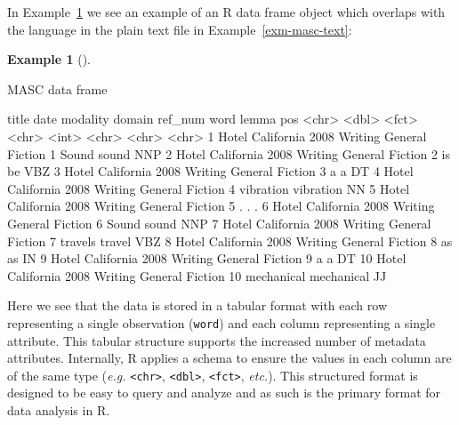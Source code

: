 \documentclass[
  letterpaper,
  DIV=11,
  numbers=noendperiod]{scrreprt}
\newenvironment{Shaded}{\begin{snugshade}}{\end{snugshade}}
\newcommand{\KeywordTok}[1]{\textcolor[rgb]{0.00,0.00,0.00}{#1}}
\newcommand{\NormalTok}[1]{\textcolor[rgb]{0.00,0.00,0.00}{#1}}
\theoremstyle{definition}
\newtheorem{example}{Example}[chapter]
\theoremstyle{remark}
\begin{document}
In Example~\ref{exm-masc-df} we see an example of an R data frame object
which overlaps with the language in the plain text file in
Example~\ref{exm-masc-text}:

\begin{example}[]\protect\hypertarget{exm-masc-df}{}\label{exm-masc-df}

MASC data frame

\begin{Shaded}
\begin{Highlighting}[]
\NormalTok{   title             date modality domain          ref\_num word       lemma      pos}
\NormalTok{   \textless{}}\KeywordTok{chr}\NormalTok{\textgreater{}            \textless{}}\KeywordTok{dbl}\NormalTok{\textgreater{} \textless{}}\KeywordTok{fct}\NormalTok{\textgreater{}    \textless{}}\KeywordTok{chr}\NormalTok{\textgreater{}             \textless{}}\KeywordTok{int}\NormalTok{\textgreater{} \textless{}}\KeywordTok{chr}\NormalTok{\textgreater{}      \textless{}}\KeywordTok{chr}\NormalTok{\textgreater{}      \textless{}}\KeywordTok{chr}\NormalTok{\textgreater{}}
\NormalTok{ 1 Hotel California  2008 Writing  General Fiction       1 Sound      sound      NNP}
\NormalTok{ 2 Hotel California  2008 Writing  General Fiction       2 is         be         VBZ}
\NormalTok{ 3 Hotel California  2008 Writing  General Fiction       3 a          a          DT}
\NormalTok{ 4 Hotel California  2008 Writing  General Fiction       4 vibration  vibration  NN}
\NormalTok{ 5 Hotel California  2008 Writing  General Fiction       5 .          .          .}
\NormalTok{ 6 Hotel California  2008 Writing  General Fiction       6 Sound      sound      NNP}
\NormalTok{ 7 Hotel California  2008 Writing  General Fiction       7 travels    travel     VBZ}
\NormalTok{ 8 Hotel California  2008 Writing  General Fiction       8 as         as         IN}
\NormalTok{ 9 Hotel California  2008 Writing  General Fiction       9 a          a          DT}
\NormalTok{10 Hotel California  2008 Writing  General Fiction      10 mechanical mechanical JJ}
\end{Highlighting}
\end{Shaded}

\end{example}

Here we see that the data is stored in a tabular format with each row
representing a single observation (\texttt{word}) and each column
representing a single attribute. This tabular structure supports the
increased number of metadata attributes. Internally, R applies a schema
to ensure the values in each column are of the same type (\emph{e.g.}
\texttt{\textless{}chr\textgreater{}},
\texttt{\textless{}dbl\textgreater{}},
\texttt{\textless{}fct\textgreater{}}, \emph{etc.}). This structured
format is designed to be easy to query and analyze and as such is the
primary format for data analysis in R.
\end{document}

